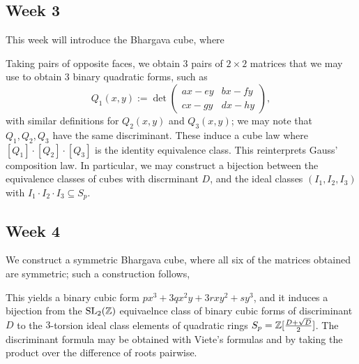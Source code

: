 \subsection{Week 3}
This week will introduce the Bhargava cube, where
\begin{center}  \end{center}
Taking pairs of opposite faces, we obtain $3$ pairs of $2 \times 2$ matrices that we may use to obtain $3$ binary quadratic forms, such as
\[ Q_1(x, y) := \det \begin{pmatrix} ax - ey & bx - fy \\ cx - gy & dx - hy \end{pmatrix}, \]
with similar definitions for $Q_2(x, y)$ and $Q_3(x, y)$; we may note that $Q_1, Q_2, Q_3$ have the same discriminant. These induce a cube law where $[Q_1] \cdot [Q_2] \cdot [Q_3]$ is the identity equivalence class. This reinterprets Gauss' composition law. In particular, we may construct a bijection between the equivalence classes of cubes with discrminant $D$, and the ideal classes $(I_1, I_2, I_3)$ with $I_1 \cdot I_2 \cdot I_3 \subseteq S_p$.

\newpage
\subsection{Week 4}
We construct a symmetric Bhargava cube, where all six of the matrices obtained are symmetric; such a construction follows,
\begin{center}  \end{center}
This yields a binary cubic form $px^3 + 3qx^2y + 3rxy^2 + sy^3$, and it induces a bijection from the $\operatorname{SL}_2(\mathbb Z)$ equivaelnce class of binary cubic forms of discriminant $D$ to the $3$-torsion ideal class elements of quadratic rings $S_p = \mathbb Z[\frac{D + \sqrt{D}}{2}]$. The discriminant formula may be obtained with Viete's formulas and by taking the product over the difference of roots pairwise.

